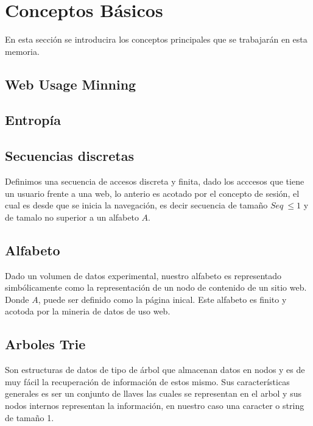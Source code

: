 
\section{Conceptos Básicos}


En esta sección se introducira los conceptos principales que se trabajarán en esta memoria.

\subsection{Web Usage Minning}


\subsection{Entropía}


\subsection{Secuencias discretas}

Definimos una secuencia de accesos discreta y finita, dado los acccesos que tiene un usuario frente a una web, lo anterio es acotado por el concepto de sesión, el cual es desde que se inicia la navegación, es decir secuencia de tamaño $Seq\ \leq 1$ y de tamalo no superior a un alfabeto $A$.


\subsection{Alfabeto}

Dado un volumen de datos experimental, nuestro alfabeto es representado simbólicamente como la representación de un nodo de contenido de un sitio web.
Donde $A $, puede ser definido como la página inical. Este alfabeto es finito y acotoda por la mineria de datos de uso web.



\subsection{Arboles Trie}


Son estructuras de datos de tipo de árbol que almacenan datos en nodos y es de muy fácil la recuperación de información de estos mismo. Sus características generales es ser un conjunto de llaves las cuales se representan en el arbol y sus nodos internos representan la información, en nuestro caso una caracter o string de tamaño 1.



